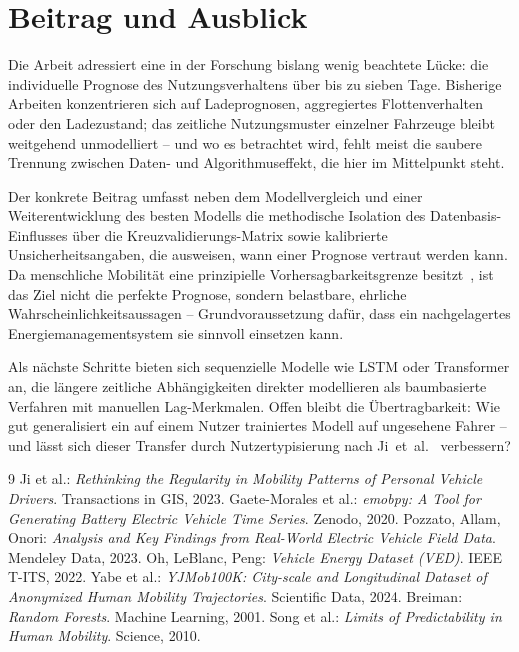 \documentclass[11pt,a4paper,twocolumn]{scrartcl}
\begin{document}
\section{Beitrag und Ausblick}

Die Arbeit adressiert eine in der Forschung bislang wenig beachtete Lücke: die individuelle Prognose des Nutzungsverhaltens über bis zu sieben Tage. Bisherige Arbeiten konzentrieren sich auf Ladeprognosen, aggregiertes Flottenverhalten oder den Ladezustand; das zeitliche Nutzungsmuster einzelner Fahrzeuge bleibt weitgehend unmodelliert -- und wo es betrachtet wird, fehlt meist die saubere Trennung zwischen Daten- und Algorithmuseffekt, die hier im Mittelpunkt steht.

Der konkrete Beitrag umfasst neben dem Modellvergleich und einer Weiterentwicklung des besten Modells die methodische Isolation des Datenbasis-Einflusses über die Kreuzvalidierungs-Matrix sowie kalibrierte Unsicherheitsangaben, die ausweisen, wann einer Prognose vertraut werden kann. Da menschliche Mobilität eine prinzipielle Vorhersagbarkeitsgrenze besitzt~\cite{song2010limits}, ist das Ziel nicht die perfekte Prognose, sondern belastbare, ehrliche Wahrscheinlichkeitsaussagen -- Grundvoraussetzung dafür, dass ein nachgelagertes Energiemanagementsystem sie sinnvoll einsetzen kann.

Als nächste Schritte bieten sich sequenzielle Modelle wie LSTM oder Transformer an, die längere zeitliche Abhängigkeiten direkter modellieren als baumbasierte Verfahren mit manuellen Lag-Merkmalen. Offen bleibt die Übertragbarkeit: Wie gut generalisiert ein auf einem Nutzer trainiertes Modell auf ungesehene Fahrer -- und lässt sich dieser Transfer durch Nutzertypisierung nach Ji~et~al.~\cite{ji2023rethinking} verbessern?

\footnotesize
\begin{thebibliography}{9}
\setlength{\itemsep}{0pt}\setlength{\parskip}{0pt}
 Ji et al.: \emph{Rethinking the Regularity in
  Mobility Patterns of Personal Vehicle Drivers}. Transactions in GIS, 2023.
 Gaete-Morales et al.: \emph{emobpy: A Tool for
  Generating Battery Electric Vehicle Time Series}. Zenodo, 2020.
 Pozzato, Allam, Onori: \emph{Analysis and Key
  Findings from Real-World Electric Vehicle Field Data}. Mendeley Data, 2023.
 Oh, LeBlanc, Peng: \emph{Vehicle Energy Dataset (VED)}.
  IEEE T-ITS, 2022.
 Yabe et al.: \emph{YJMob100K: City-scale and
  Longitudinal Dataset of Anonymized Human Mobility Trajectories}. Scientific
  Data, 2024.
 Breiman: \emph{Random Forests}. Machine Learning,
  2001.
 Song et al.: \emph{Limits of Predictability in Human
  Mobility}. Science, 2010.
\end{thebibliography}
\end{document}
